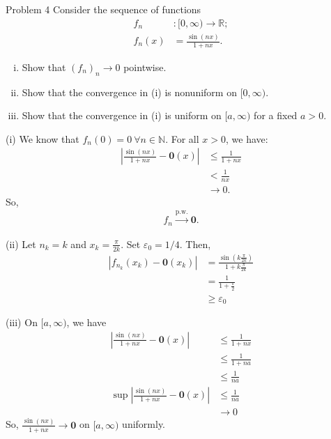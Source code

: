 \documentclass[8pt]{extarticle}
\renewcommand{\mathbf}[1]{\mathbold{#1}}
\newcommand{\N}{\mathbb{N}}
\newcommand{\R}{\mathbb{R}}
\begin{document}
  \begin{problem}{Problem 4}
    Consider the sequence of functions
    \begin{align*}
      f_n&:[0,\infty) \rightarrow \R;\\
      f_n(x) &= \frac{\sin(nx)}{1 + nx}.
    \end{align*}
    \begin{enumerate}[(i)]
      \item Show that $(f_n)_n\rightarrow 0$ pointwise.
      \item Show that the convergence in (i) is nonuniform on $[0,\infty)$.
      \item Show that the convergence in (i) is uniform on $[a,\infty)$ for a fixed $a > 0$.
    \end{enumerate}
    \tcblower
    \begin{problem}{(i)}
      We know that $f_n(0) = 0~\forall n\in\N$. For all $x > 0$, we have:
      \begin{align*}
        \left|\frac{\sin(nx)}{1+nx} - \mathbf{0}(x)\right| &\leq \frac{1}{1 + nx}\\
                                                           &< \frac{1}{nx}\\
                                                           &\rightarrow 0.
      \end{align*}
      So,
      \begin{align*}
        f_n \xrightarrow{\text{p.w.}} \mathbf{0}.
      \end{align*}
    \end{problem}
    \begin{problem}{(ii)}
      Let $n_k = k$ and $x_k = \frac{\pi}{2k}$. Set $\varepsilon_0 = 1/4$. Then,
      \begin{align*}
        \left|f_{n_k}(x_k) - \mathbf{0}(x_k)\right| &= \frac{\sin\left(k\frac{\pi}{2k}\right)}{1 + k\frac{\pi}{2k}}\\
                                                    &= \frac{1}{1 + \frac{\pi}{2}}\\
                                                    &\geq \varepsilon_0
      \end{align*}
    \end{problem}
    \begin{problem}{(iii)}
      On $[a,\infty)$, we have
      \begin{align*}
        \left|\frac{\sin(nx)}{1 + nx} - \mathbf{0}(x)\right| &\leq \frac{1}{1 + nx}\\
                                                             &\leq \frac{1}{1 + na}\\
                                                             &\leq \frac{1}{na}\\
        \sup\left|\frac{\sin(nx)}{1 + nx} - \mathbf{0}(x)\right| &\leq \frac{1}{na}\\
                                                             &\rightarrow 0
      \end{align*}
      So, $\frac{\sin(nx)}{1 + nx} \rightarrow \mathbf{0}$ on $[a,\infty)$ uniformly.
    \end{problem}
  \end{problem}
\end{document}
